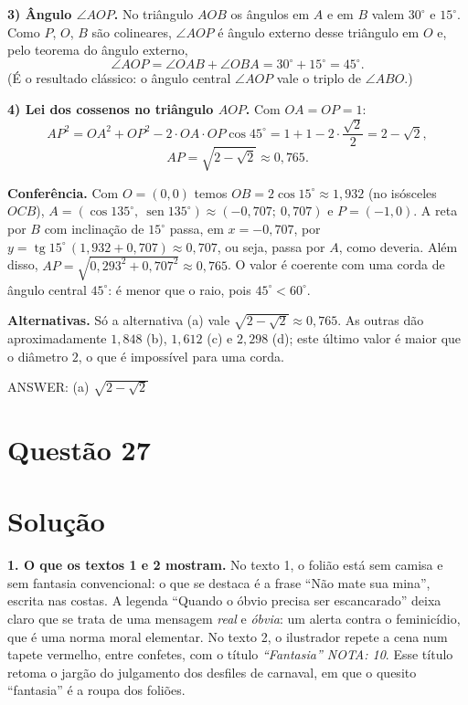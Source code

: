 \documentclass{article}%
\begin{document}
\textbf{3) Ângulo $\angle AOP$.} No triângulo $AOB$ os ângulos em $A$ e em $B$ valem $30^\circ$ e $15^\circ$. Como $P$, $O$, $B$ são colineares, $\angle AOP$ é ângulo externo desse triângulo em $O$ e, pelo teorema do ângulo externo,
\[
\angle AOP=\angle OAB+\angle OBA=30^\circ+15^\circ=45^\circ .
\]
(É o resultado clássico: o ângulo central $\angle AOP$ vale o triplo de $\angle ABO$.)

\textbf{4) Lei dos cossenos no triângulo $AOP$.} Com $OA=OP=1$:
\[
AP^2=OA^2+OP^2-2\cdot OA\cdot OP\cos 45^\circ=1+1-2\cdot\frac{\sqrt2}{2}=2-\sqrt2,
\]
\[
AP=\sqrt{2-\sqrt2}\approx 0{,}765 .
\]

\textbf{Conferência.} Com $O=(0,0)$ temos $OB=2\cos 15^\circ\approx 1{,}932$ (no isósceles $OCB$), $A=(\cos 135^\circ,\ \operatorname{sen} 135^\circ)\approx(-0{,}707;\ 0{,}707)$ e $P=(-1,0)$. A reta por $B$ com inclinação de $15^\circ$ passa, em $x=-0{,}707$, por $y=\operatorname{tg}15^\circ\,(1{,}932+0{,}707)\approx 0{,}707$, ou seja, passa por $A$, como deveria. Além disso, $AP=\sqrt{0{,}293^2+0{,}707^2}\approx 0{,}765$. O valor é coerente com uma corda de ângulo central $45^\circ$: é menor que o raio, pois $45^\circ<60^\circ$.

\textbf{Alternativas.} Só a alternativa (a) vale $\sqrt{2-\sqrt2}\approx 0{,}765$. As outras dão aproximadamente $1{,}848$ (b), $1{,}612$ (c) e $2{,}298$ (d); este último valor é maior que o diâmetro $2$, o que é impossível para uma corda.

ANSWER: (a) $\sqrt{2-\sqrt{2}}$%
\newpage%
\section*{Questão 27}

\section*{Solução}

\textbf{1. O que os textos 1 e 2 mostram.} No texto 1, o folião está sem camisa e sem fantasia convencional: o que se destaca é a frase ``Não mate sua mina'', escrita nas costas. A legenda ``Quando o óbvio precisa ser escancarado'' deixa claro que se trata de uma mensagem \emph{real} e \emph{óbvia}: um alerta contra o feminicídio, que é uma norma moral elementar. No texto 2, o ilustrador repete a cena num tapete vermelho, entre confetes, com o título \emph{``Fantasia'' NOTA: 10}. Esse título retoma o jargão do julgamento dos desfiles de carnaval, em que o quesito ``fantasia'' é a roupa dos foliões.
\end{document}

